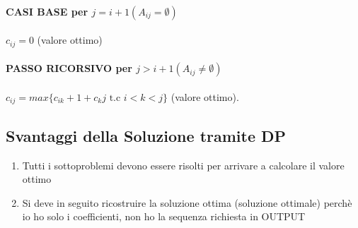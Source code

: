 \paragraph*{CASI BASE per $j=i+1 (A_{ij}=\emptyset)$}
$c_{ij} = 0$ (valore ottimo)
\paragraph*{PASSO RICORSIVO per $j > i +1 (A_{ij} \neq \emptyset)$}
$c_{ij} = max\{c_{ik} + 1 + c_kj \text{ t.c } i < k < j\}$ (valore ottimo).
\subsection{Svantaggi della Soluzione tramite DP}
\begin{enumerate}
    \item Tutti i sottoproblemi devono essere risolti per arrivare a calcolare il valore ottimo
    \item Si deve in seguito ricostruire la soluzione ottima (soluzione ottimale) perchè io ho solo
    i coefficienti, non ho la sequenza richiesta in OUTPUT
\end{enumerate}
